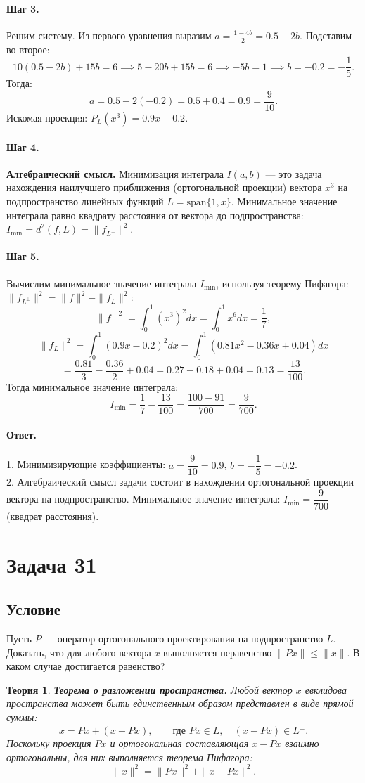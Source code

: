 \documentclass[12pt,a4paper]{article}
\theoremstyle{solution}
\newtheorem*{theory}{Теория}
\newcommand{\task}[1]{\newpage\section*{Задача #1}}
\newcommand{\answer}{\paragraph{Ответ.}}
\newcommand{\step}[1]{\paragraph{Шаг #1.}}
\begin{document}
\step{3} Решим систему. Из первого уравнения выразим $a = \frac{1 - 4b}{2} = 0.5 - 2b$. Подставим во второе:
\[
10(0.5 - 2b) + 15b = 6 \implies 5 - 20b + 15b = 6 \implies -5b = 1 \implies b = -0.2 = -\frac{1}{5}.
\]
Тогда:
\[
a = 0.5 - 2(-0.2) = 0.5 + 0.4 = 0.9 = \frac{9}{10}.
\]
Искомая проекция: $P_L(x^3) = 0.9x - 0.2$.

\step{4} \textbf{Алгебраический смысл.} Минимизация интеграла $I(a, b)$ — это задача нахождения наилучшего приближения (ортогональной проекции) вектора $x^3$ на подпространство линейных функций $L = \mathrm{span}\{1, x\}$. Минимальное значение интеграла равно квадрату расстояния от вектора до подпространства: $I_{\min} = d^2(f, L) = \|f_{L^\perp}\|^2$.

\step{5} Вычислим минимальное значение интеграла $I_{\min}$, используя теорему Пифагора: $\|f_{L^\perp}\|^2 = \|f\|^2 - \|f_L\|^2$:
\[
\|f\|^2 = \int_0^1 (x^3)^2 dx = \int_0^1 x^6 dx = \frac{1}{7},
\]
\[
\|f_L\|^2 = \int_0^1 (0.9x - 0.2)^2 dx = \int_0^1 (0.81x^2 - 0.36x + 0.04) dx 
\]
\[
= \frac{0.81}{3} - \frac{0.36}{2} + 0.04 = 0.27 - 0.18 + 0.04 = 0.13 = \frac{13}{100}.
\]
Тогда минимальное значение интеграла:
\[
I_{\min} = \frac{1}{7} - \frac{13}{100} = \frac{100 - 91}{700} = \frac{9}{700}.
\]

\answer
1. Минимизирующие коэффициенты: $a = \dfrac{9}{10} = 0.9$, $b = -\dfrac{1}{5} = -0.2$.\\
2. Алгебраический смысл задачи состоит в нахождении ортогональной проекции вектора на подпространство. Минимальное значение интеграла: $I_{\min} = \dfrac{9}{700}$ (квадрат расстояния).
\task{31}
\subsection*{Условие}
Пусть $P$ — оператор ортогонального проектирования на подпространство $L$. Доказать, что для любого вектора $x$ выполняется неравенство $\|Px\| \leq \|x\|$. В каком случае достигается равенство?

\begin{theory}
\textbf{Теорема о разложении пространства.} Любой вектор $x$ евклидова пространства может быть единственным образом представлен в виде прямой суммы:
\[
x = Px + (x - Px), \qquad \text{где } Px \in L, \quad (x - Px) \in L^\perp.
\]
Поскольку проекция $Px$ и ортогональная составляющая $x - Px$ взаимно ортогональны, для них выполняется теорема Пифагора:
\[
\|x\|^2 = \|Px\|^2 + \|x - Px\|^2.
\]
\end{theory}
\end{document}
